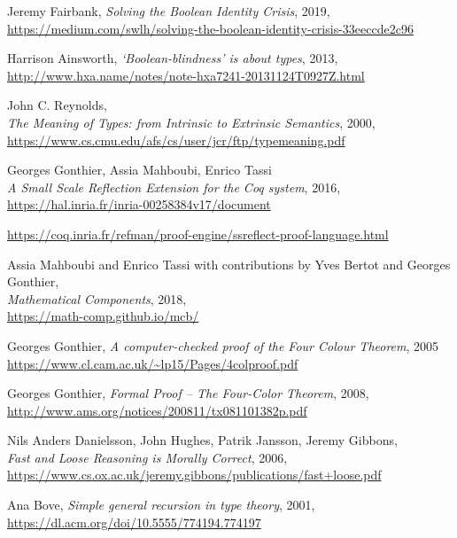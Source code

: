 \documentclass[declaration,mgr,english,shortabstract]{iithesis}
\begin{document}
\begin{thebibliography}{1}
    Jeremy Fairbank,
    \textit{Solving the Boolean Identity Crisis},
    2019, \\
    \url{https://medium.com/swlh/solving-the-boolean-identity-crisis-33eeccde2c96}

    Harrison Ainsworth,
    \textit{‘Boolean-blindness’ is about types},
    2013, \\
    \url{http://www.hxa.name/notes/note-hxa7241-20131124T0927Z.html}

    John C. Reynolds, \\
    \textit{The Meaning of Types: from Intrinsic to Extrinsic Semantics},
    2000, \\
    \url{https://www.cs.cmu.edu/afs/cs/user/jcr/ftp/typemeaning.pdf}

    Georges Gonthier, Assia Mahboubi, Enrico Tassi \\
    \textit{A Small Scale Reflection Extension for the Coq system}, 2016, \\
    \url{https://hal.inria.fr/inria-00258384v17/document}

    \url{https://coq.inria.fr/refman/proof-engine/ssreflect-proof-language.html}
    
    Assia Mahboubi and Enrico Tassi with contributions by Yves Bertot and Georges Gonthier, \\
    \textit{Mathematical Components}, 2018, \\
    \url{https://math-comp.github.io/mcb/}

    Georges Gonthier,
    \textit{A computer-checked proof of the Four Colour Theorem}, 2005 \\
    \url{https://www.cl.cam.ac.uk/~lp15/Pages/4colproof.pdf}

    Georges Gonthier,
    \textit{Formal Proof -- The Four-Color Theorem}, 2008, \\
    \url{http://www.ams.org/notices/200811/tx081101382p.pdf}

    Nils Anders Danielsson, John Hughes, Patrik Jansson, Jeremy Gibbons, \\
    \textit{Fast and Loose Reasoning is Morally Correct}, 2006, \\
    \url{https://www.cs.ox.ac.uk/jeremy.gibbons/publications/fast+loose.pdf}

    Ana Bove,
    \textit{Simple general recursion in type theory},
    2001, \\
    \url{https://dl.acm.org/doi/10.5555/774194.774197}


\end{thebibliography}
\end{document}
